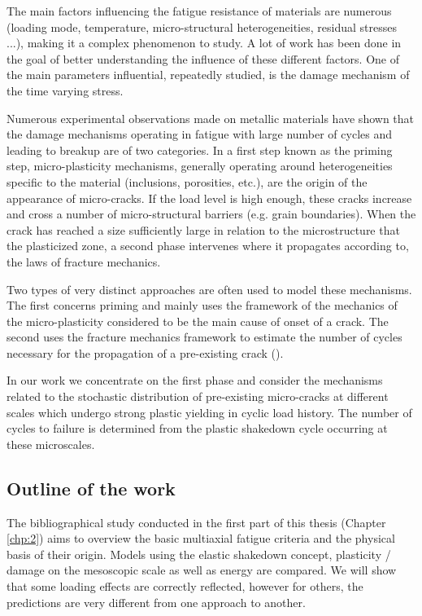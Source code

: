 The main factors influencing the fatigue resistance of materials are  numerous
(loading mode, temperature, micro-structural heterogeneities, residual stresses ...),
making it a complex phenomenon to study. A lot of work has been done in the goal of
better understanding the influence of these different factors. One of the main parameters
influential, repeatedly studied, is the damage mechanism of the time varying stress.

Numerous experimental observations made on metallic materials have shown
that the damage mechanisms operating in fatigue with large number of cycles and
leading to breakup are of two categories. In a first step known as the priming step,
micro-plasticity mechanisms, generally operating around heterogeneities specific to the
material (inclusions, porosities, etc.), are the origin of the appearance of micro-cracks. If the load level is high enough, these cracks increase and cross a number of micro-structural barriers (e.g. grain boundaries). When the crack has reached a size
sufficiently large in relation to the microstructure that the plasticized zone, a second phase intervenes where it propagates according to, the laws of fracture mechanics.

Two types of very distinct approaches are often used to model these mechanisms. The
first concerns priming and mainly uses the framework of the mechanics of the
micro-plasticity considered to be the main cause of onset
of a crack. The second uses the fracture mechanics framework to estimate the number
of cycles necessary for the propagation of a pre-existing crack (\cite{koutiri2011effet}). 

In our work we concentrate on the first phase and consider the mechanisms related to the stochastic distribution of pre-existing micro-cracks at different scales which undergo strong plastic yielding in cyclic load history. The number of cycles to failure is determined from the plastic shakedown cycle occurring at these microscales.

\subsection{Outline of the work}
The bibliographical study conducted in the first part of this thesis  (Chapter \ref{chp:2}) aims to
overview the basic multiaxial fatigue criteria and the physical basis of their origin. Models using the elastic shakedown concept, plasticity / damage on the mesoscopic scale as well as energy
are compared. We will show that some loading effects are correctly reflected, however for others, the predictions are very different from one approach to another.

